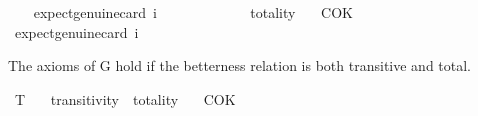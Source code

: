 \begin{isabellebody}
\ \ \isamarkupfalse%
\ {\isacharbrackleft}{\kern0pt}expect{\isacharequal}{\kern0pt}genuine{\isacharcomma}{\kern0pt}card\ i{\isacharequal}{\kern0pt}{}{\isacharbrackright}{\kern0pt}\ %
\ \isanewline
%
\isadelimproof
\ \ %
\endisadelimproof
%
\isatagproof
{}\isamarkupfalse%
%
\endisatagproof
{\isafoldproof}%
%
\isadelimproof
\ \ \isanewline
%
\endisadelimproof
\isanewline
{}\isamarkupfalse%
\ \isanewline
\ \ \ totality\isanewline
\ \ \ COK{\isacharcolon}{\kern0pt}{\isachardoublequoteopen}{\isasymlfloor}{\isasymcirc}{\isacharless}{\kern0pt}{\isacharparenleft}{\kern0pt}{\isasympsi}\isactrlbold {\isasymrightarrow}{\isasympsi}\ \isactrlbold {\isasymrightarrow}\ {\isacharparenleft}{\kern0pt}{\isasymcirc}{\isacharless}{\kern0pt}{\isasympsi}\ \isactrlbold {\isasymrightarrow}\ {\isasymcirc}{\isacharless}{\kern0pt}{\isasympsi}\ \isanewline
\ \ \isamarkupfalse%
\ {\isacharbrackleft}{\kern0pt}expect{\isacharequal}{\kern0pt}genuine{\isacharcomma}{\kern0pt}card\ i{\isacharequal}{\kern0pt}{}{\isacharbrackright}{\kern0pt}\ %
\ \isanewline
%
\isadelimproof
\ \ %
\endisadelimproof
%
\isatagproof
{}\isamarkupfalse%
%
\endisatagproof
{\isafoldproof}%
%
\isadelimproof
%
\endisadelimproof
%
\begin{isamarkuptext}%
The axioms of G hold if the betterness relation is both transitive and total.%
\end{isamarkuptext}\isamarkuptrue%
\isamarkupfalse%
\ T{}{}{\isacharcolon}{\kern0pt}\isanewline
\ \ \ transitivity\ \ totality\isanewline
\ \ \ COK{\isacharprime}{\kern0pt}{\isacharcolon}{\kern0pt}{\isachardoublequoteopen}{\isasymlfloor}{\isasymcirc}{\isacharless}{\kern0pt}{\isacharparenleft}{\kern0pt}{\isasympsi}\isactrlbold {\isasymrightarrow}{\isasympsi}\ \isactrlbold {\isasymrightarrow}\ {\isacharparenleft}{\kern0pt}{\isasymcirc}{\isacharless}{\kern0pt}{\isasympsi}\ \isactrlbold {\isasymrightarrow}\ {\isasymcirc}{\isacharless}{\kern0pt}{\isasympsi}\ \isanewline

\end{isabellebody}
